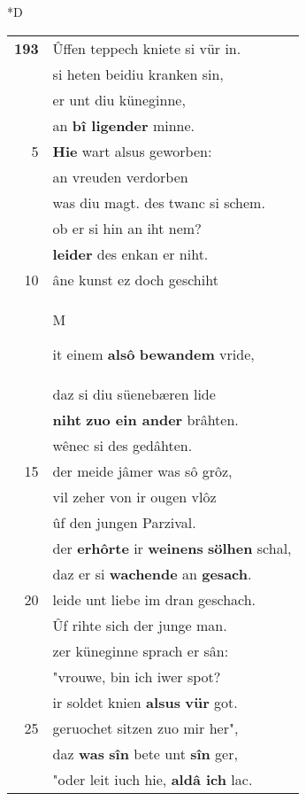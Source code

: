 \documentclass[8pt,a4paper,notitlepage]{article}
\begin{document}
\begin{table}[ht]
\begin{minipage}[t]{0.5\linewidth}
\small
\begin{center}*D
\end{center}
\begin{tabular}{rl}
\textbf{193} & Ûffen teppech kniete si vür in.\\ 
 & si heten beidiu kranken sin,\\ 
 & er unt diu küneginne,\\ 
 & an \textbf{bî ligender} minne.\\ 
5 & \textbf{Hie} wart alsus geworben:\\ 
 & an vreuden verdorben\\ 
 & was diu magt. des twanc si schem.\\ 
 & ob er si hin an iht nem?\\ 
 & \textbf{leider} des enkan er niht.\\ 
10 & âne kunst ez doch geschiht\\ 
 & \begin{large}M\end{large}it einem \textbf{alsô} \textbf{bewandem} vride,\\ 
 & daz si diu süenebæren lide\\ 
 & \textbf{niht} \textbf{zuo ein ander} brâhten.\\ 
 & wênec si des gedâhten.\\ 
15 & der meide jâmer was sô grôz,\\ 
 & vil zeher von ir ougen vlôz\\ 
 & ûf den jungen Parzival.\\ 
 & der \textbf{erhôrte} ir \textbf{weinens} \textbf{sölhen} schal,\\ 
 & daz er si \textbf{wachende} an \textbf{gesach}.\\ 
20 & leide unt liebe im dran geschach.\\ 
 & Ûf rihte sich der junge man.\\ 
 & zer küneginne sprach er sân:\\ 
 & "vrouwe, bin ich iwer spot?\\ 
 & ir soldet knien \textbf{alsus} \textbf{vür} got.\\ 
25 & geruochet sitzen zuo mir her",\\ 
 & daz \textbf{was} \textbf{sîn} bete unt \textbf{sîn} ger,\\ 
 & "oder leit iuch hie, \textbf{aldâ ich} lac.\\ 

\end{tabular}
\end{minipage}
\end{table}
\end{document}
